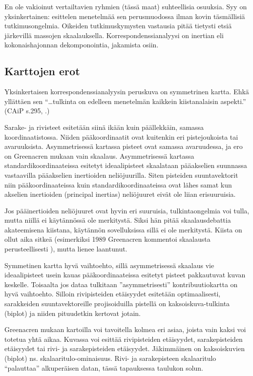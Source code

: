 \documentclass[
  finnish,
]{book}
\begin{document}
En ole vakioinut vertailtavien ryhmien (tässä maat) suhteellisia osuuksia. Syy on
yksinkertainen: esittelen menetelmää sen perusmuodossa ilman kovin täsmällisiä
tutkimusongelmia. Oikeiden tutkimuskymysten vastausia pitää tietysti etsiä järkevillä
massojen skaalauksella. Korrespondenssianalyysi on inertian eli kokonaishajonnan
dekomponointia, jakamista osiin.

\hypertarget{karttojen-erot}{%
\subsection{Karttojen erot}\label{karttojen-erot}}

Yksinkertaisen korrespondenssianalyysin peruskuva on symmetrinen kartta. Ehkä
yllättäen sen ``\ldots tulkinta on edelleen menetelmän kaikkein kiistanalaisin aspekti.''
(CAiP s.295, \citet{RefWorks:doc:5c768b09e4b02df9431e950a}.)

Sarake- ja rivisteet esitetään siinä ikään kuin päällekkäin, samassa koordinaatistossa.
Niiden pääkoordinaatit ovat kuitenkin eri pistejoukoista tai avaruuksista. Asymmetrisessä
kartassa pisteet ovat samassa avaruudessa, ja ero on Greenacren mukaan vain skaalaus.
Asymmetrisessä kartassa standardikoordinaateissa esitetyt ideaalipisteet skaalataan
pääakselien suunnassa vastaavilla pääakselien inertioiden neliöjuurilla. Siten pisteiden
suuntavektorit niin pääkoordinaateissa kuin standardikoordinaateissa ovat lähes samat
kun akselien inertioiden (principal inertias) neliöjuuret eivät ole liian erisuuruisia.

Jos pääinertioiden neliöjuuret ovat hyvin eri suuruisia, tulkintaongelmia voi tulla, mutta
niillä ei käytännössä ole merkitystä. Siksi hän pitää skaalausdebattia akateemisena
kiistana, käytännön sovelluksissa sillä ei ole merkitystä. Kiista on ollut aika
sitkeä (esimerkiksi 1989 Greenacren kommentoi skaalausta perusteellisesti
\citep{RefWorks:doc:5c754c6de4b0947789165cde}), mutta lienee laantunut.

Symmetinen kartta hyvä vaihtoehto, sillä asymmetrisessä skaalaus vie
ideaalipisteet usein kauas pääkoordinaateissa esitetyt pisteet pakkautuvat kuvan
keskelle. Toisaalta jos dataa tulkitaan ''asymmetrisesti'' kontribuutiokartta on
hyvä vaihtoehto. Silloin rivipisteiden etäisyydet esitetään optimaalisesti,
sarakkeiden suuntavektoreille projisoiduilla pistellä on kaksoiskuva-tulkinta
(biplot) ja niiden pituudetkin kertovat jotain.

Greenacren mukaan kartoilla voi tavoitella kolmea eri asiaa, joista vain kaksi
voi totetua yhtä aikaa. Kuvassa voi esittää rivipisteiden etäisyydet,
sarakepisteiden etäisyydet tai rivi- ja sarakepisteiden etäisyydet. Jäkimmäinen on
kaksoiskuvien (biplot) ns. skalaaritulo-ominaisuus. Rivi- ja sarakepisteen
skalaaritulo ``palauttaa'' alkuperäisen datan, tässä tapauksessa taulukon solun.
\end{document}
